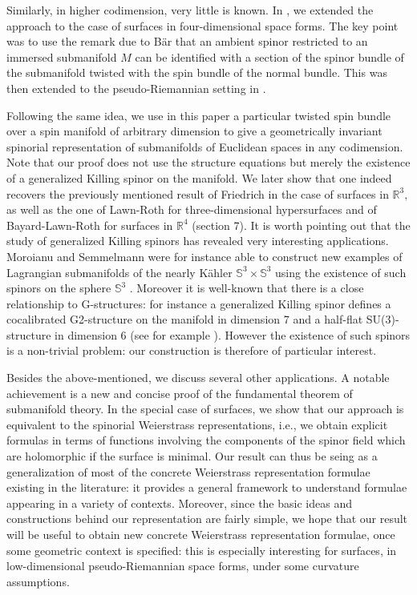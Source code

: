 \documentclass{amsart}
\begin{document}
Similarly, in higher codimension, very little is known. In \cite{BLR}, we extended the approach to the case of surfaces in four-dimensional space forms. The key point was to use the remark due to B\"ar \cite{Ba} that an ambient spinor restricted to an immersed submanifold $M$ can be identified with a section of the spinor bundle of the submanifold twisted with the spin bundle of the normal bundle. This was then extended to the pseudo-Riemannian setting in \cite{Bay,BP}.

Following the same idea, we use in this paper a particular twisted spin bundle over a spin manifold of arbitrary dimension to give a geometrically invariant spinorial representation of submanifolds of Euclidean spaces in any codimension. Note that our proof does not use the structure equations but merely the existence of a generalized Killing spinor on the manifold. We later show that one indeed recovers the previously mentioned result of Friedrich \cite{Fr} in the case of surfaces in ${\mathbb{R}}^3,$ as well as the one of Lawn-Roth \cite{LR1} for three-dimensional hypersurfaces and of Bayard-Lawn-Roth \cite{BLR} for surfaces in ${\mathbb{R}}^4$ (section 7). It is worth pointing out that the study of generalized Killing spinors has revealed very interesting applications. Moroianu and Semmelmann were for instance able to construct new examples of Lagrangian submanifolds of the nearly K\"ahler $\mathbb{S}^3\times\mathbb{S}^3$ using the existence of such spinors on the sphere $\mathbb{S}^3$ \cite{MS}. Moreover it is well-known that there is a close relationship to G-structures: for instance a generalized Killing spinor defines a cocalibrated G2-structure on the manifold in dimension 7 and a half-flat SU(3)-structure in dimension 6 (see for example \cite{CS}). However the existence of such spinors is a non-trivial problem: our construction is therefore of particular interest.

 Besides the above-mentioned, we discuss several other applications. A notable achievement is a new and concise proof of the fundamental theorem of submanifold theory. In the special case of surfaces, we show that our approach is equivalent to the spinorial Weierstrass representations, i.e., we obtain explicit formulas in terms of functions involving the components of the spinor field which are holomorphic if the surface is minimal.  
Our result can thus be seing as a generalization of most of the concrete Weierstrass representation formulae existing in the literature: it provides a general framework to understand formulae appearing in a variety of contexts. Moreover, since the basic ideas and constructions behind our representation are fairly simple, we hope that our result will be useful to obtain new concrete Weierstrass representation formulae, once some geometric context is specified: this is especially interesting for surfaces, in low-dimensional pseudo-Riemannian space forms, under some curvature assumptions. 
\end{document}
